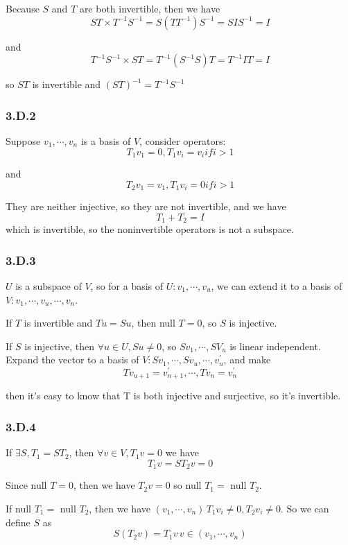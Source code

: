 Because $S$ and $T$ are both invertible, then we have
\[ST\times T^{-1}S^{-1} = S(TT^{-1})S^{-1} = SIS^{-1} = I\]

and 
\[T^{-1}S^{-1} \times ST = T^{-1}(S^{-1}S)T = T^{-1}IT = I\]

so $ST$ is invertible and $(ST)^{-1} = T^{-1}S^{-1}$

\subsubsection*{3.D.2}

Suppose $v_{1}, \cdots, v_{n}$ is a basis of $V$, consider operators:
\[T_{1}v_{1} = 0, T_{1}v_{i} = v_{i} if i > 1\]

and 
\[T_{2}v_{1} = v_{1}, T_{1}v_{i} = 0 if i > 1\]

They are neither injective, so they are not invertible, and we have 
\[T_{1} + T_{2} = I\]
which is invertible, so the noninvertible operators is not a subspace.

\subsubsection*{3.D.3}
$U$ is a subspace of $V$, so for a basis of $U: v_{1}, \cdots, v_{u}$, we can extend it to a basis of $V: v_{1},\cdots, v_{u}, \cdots, v_{n}$.

If $T$ is invertible and $Tu = Su$, then null $T = {0}$, so $S$ is injective.

If $S$ is injective, then $\forall u \in U, Su \neq {0}$, so $Sv_{1}, \cdots, SV_{u}$ is linear independent. 
Expand the vector to a basis of $V: Sv_{1}, \cdots, Sv_{u}, \cdots, v^{'}_{n}$, and make
\[Tv_{u+1} = v^{'}_{n+1}, \cdots, Tv_{n} = v^{'}_{n}\]

then it's easy to know that T is both injective and surjective, so it's invertible.

\subsubsection*{3.D.4}

If $\exists S, T_{1} = ST_{2}$, then $\forall v\in V, T_{1}v = 0 $ we have
\[T_{1}v = ST_{2}v = 0\]

Since null $T = {0}$, then we have $T_{2}v = 0$ so null $T_{1} = $ null $T_{2}$.

If null $T_{1} = $ null $T_{2}$, then we have $(v_{1},\cdots, v_{n})\, T_{1}v_{i} \neq 0, T_{2}v_{i} \neq 0$.
So we can define $S$ as 
\[S(T_{2}v) = T_{1}v\, v\in (v_{1}, \cdots, v_{n})\]

